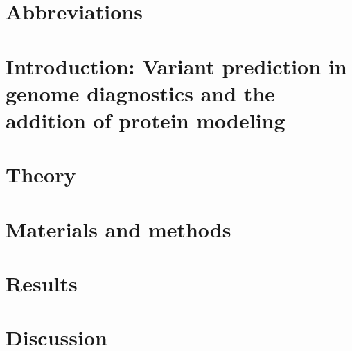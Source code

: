 \documentclass[10pt]{article}
\begin{document}
	\section*{Abbreviations}
	
	\label{section:Chap_Abbreviations}
	\newpage
	
	\tableofcontents
	\newpage
	
	\listoffigures
	\newpage
	
	\listoftables
	\newpage
	
	\section[Introduction]{Introduction: Variant prediction in genome diagnostics and the addition of protein modeling}
	
	\label{section:Chap_Variant_Prediction_In_Genome_Diagnostics}
	\newpage
	
	\section{Theory}
	
	\label{section:Chap_PMT}
	\newpage
	
	
	\label{section:Chap_Monte_Carlo}
	\newpage
	
	
	\label{section:Chap_Cell_Death}
	\newpage
	
	\section{Materials and methods}
	
	\label{section:Chap_Material_and_Methods}
	\newpage
	
	\section{Results}
	
	\label{section:Chap_Results}
	\newpage
	
	\section{Discussion}
	
	\label{section:Chap_Discussion}
	\newpage
	
\end{document}
